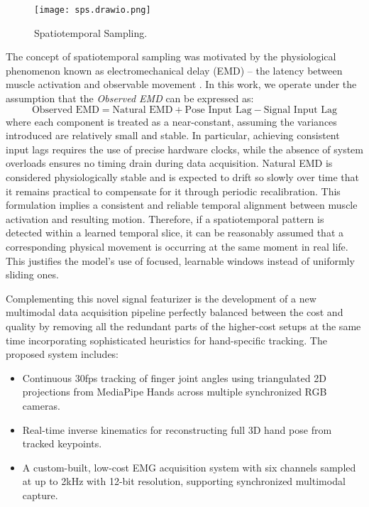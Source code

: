 \begin{figure}[H]
    \centering
    \texttt{[image: sps.drawio.png]}
    \caption{Spatiotemporal Sampling.}
    \label{fig:sps}
\end{figure}

The concept of spatiotemporal sampling was motivated by the physiological phenomenon known as electromechanical delay (EMD) -- the latency between muscle activation and observable movement \cite{ngeo2014continuous}. In this work, we operate under the assumption that the \textit{Observed EMD} can be expressed as:
\[
\text{Observed EMD} = \text{Natural EMD} + \text{Pose Input Lag} - \text{Signal Input Lag}
\]
where each component is treated as a near-constant, assuming the variances introduced are relatively small and stable. In particular, achieving consistent input lags requires the use of precise hardware clocks, while the absence of system overloads ensures no timing drain during data acquisition. Natural EMD is considered physiologically stable and is expected to drift so slowly over time that it remains practical to compensate for it through periodic recalibration. This formulation implies a consistent and reliable temporal alignment between muscle activation and resulting motion. Therefore, if a spatiotemporal pattern is detected within a learned temporal slice, it can be reasonably assumed that a corresponding physical movement is occurring at the same moment in real life. This justifies the model's use of focused, learnable windows instead of uniformly sliding ones.

Complementing this novel signal featurizer is the development of a new multimodal data acquisition pipeline perfectly balanced between the cost and quality by removing all the redundant parts of the higher-cost setups at the same time incorporating sophisticated heuristics for hand-specific tracking. The proposed system includes:
\begin{itemize}
    \item Continuous 30fps tracking of finger joint angles using triangulated 2D projections from MediaPipe Hands across multiple synchronized RGB cameras.
    \item Real-time inverse kinematics for reconstructing full 3D hand pose from tracked keypoints.
    \item A custom-built, low-cost EMG acquisition system with six channels sampled at up to 2kHz with 12-bit resolution, supporting synchronized multimodal capture.
\end{itemize}

